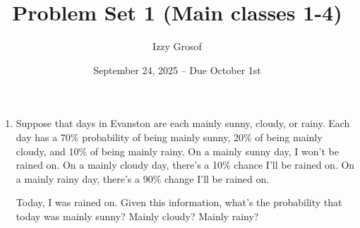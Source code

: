 \documentclass{article}
\title{Problem Set 1 (Main classes 1-4)}
\author{Izzy Grosof}
\date{September 24, 2025 -- Due October 1st}
\begin{document}
\maketitle

\begin{enumerate}
    \item Suppose that days in Evanston are each mainly sunny, cloudy, or rainy.
    Each day has a 70\% probability of being mainly sunny, 20\% of being mainly cloudy, and 10\% of being mainly rainy.
    On a mainly sunny day, I won't be rained on. 
    On a mainly cloudy day, there's a 10\% chance I'll be rained on.
    On a mainly rainy day, there's a 90\% change I'll be rained on.

    Today, I was rained on. Given this information, what's the probability that today was mainly sunny? Mainly cloudy? Mainly rainy?


\end{enumerate}
\end{document}

